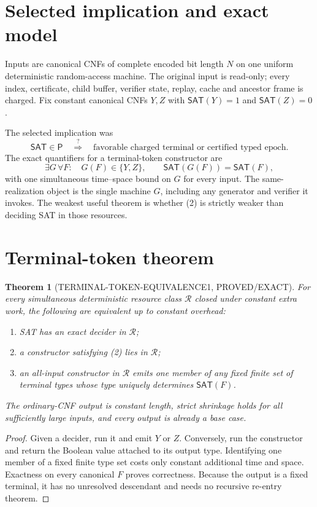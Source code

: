 \documentclass[11pt]{article}
\newtheorem{theorem}{Theorem}
\newcommand{\SAT}{\mathsf{SAT}}
\begin{document}
\section{Selected implication and exact model}
Inputs are canonical CNFs of complete encoded bit length $N$ on one uniform
deterministic random-access machine.  The original input is read-only; every
index, certificate, child buffer, verifier state, replay, cache and ancestor
frame is charged.  Fix constant canonical CNFs $Y,Z$ with
$\SAT(Y)=1$ and $\SAT(Z)=0$.

The selected implication was
\[
 \SAT\in\mathsf P
 \quad\stackrel{?}{\Longrightarrow}\quad
 \text{favorable charged terminal or certified typed epoch}.       \tag{1}
\]
The exact quantifiers for a terminal-token constructor are
\[
 \exists G\,\forall F:\quad
 G(F)\in\{Y,Z\},\qquad \SAT(G(F))=\SAT(F),             \tag{2}
\]
with one simultaneous time--space bound on $G$ for every input.  The
same-realization object is the single machine $G$, including any generator
and verifier it invokes.  The weakest useful theorem is whether (2) is
strictly weaker than deciding SAT in those resources.

\section{Terminal-token theorem}

\begin{theorem}[TERMINAL-TOKEN-EQUIVALENCE1, PROVED/EXACT]
For every simultaneous deterministic resource class $\mathcal R$ closed
under constant extra work, the following are equivalent up to constant
overhead:
\begin{enumerate}
\item SAT has an exact decider in $\mathcal R$;
\item a constructor satisfying (2) lies in $\mathcal R$;
\item an all-input constructor in $\mathcal R$ emits one member of any fixed
finite set of terminal types whose type uniquely determines $\SAT(F)$.
\end{enumerate}
The ordinary-CNF output is constant length, strict shrinkage holds for all
sufficiently large inputs, and every output is already a base case.
\end{theorem}

\begin{proof}
Given a decider, run it and emit $Y$ or $Z$.  Conversely, run the constructor
and return the Boolean value attached to its output type.  Identifying one
member of a fixed finite type set costs only constant additional time and
space.  Exactness on every canonical $F$ proves correctness.  Because the
output is a fixed terminal, it has no unresolved descendant and needs no
recursive re-entry theorem.
\end{proof}
\end{document}
